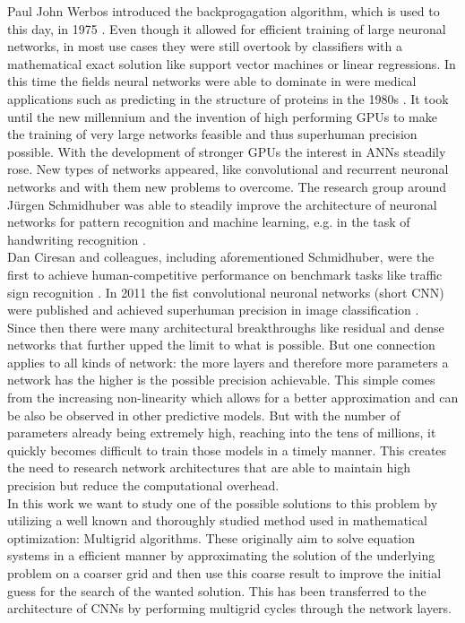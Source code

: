\documentclass[a4paper,12pt,titlepage,enabledeprecatedfontcommands]{scrreprt}
\begin{document}
Paul John Werbos introduced the backprogagation algorithm, which is used to this day, in 1975 \cite{werbos1975beyond}. Even though it allowed for efficient training of large neuronal networks, in most use cases they were still overtook by classifiers with a mathematical exact solution like support vector machines or linear regressions. In this time the fields neural networks were able to dominate in were medical applications such as predicting in the structure of proteins in the 1980s \cite{Rost1993PredictionOP}.
It took until the new millennium and the invention of high performing GPUs to make the training of very large networks feasible and thus superhuman precision possible. With the development of stronger GPUs the interest in ANNs steadily rose. New types of networks appeared, like convolutional and recurrent neuronal networks and with them new problems to overcome. The research group around Jürgen Schmidhuber was able to steadily improve the architecture of neuronal networks for pattern recognition and machine learning, e.g. in the task of handwriting recognition \cite{NIPS2008_3449}. \\
Dan Ciresan and colleagues, including aforementioned Schmidhuber, were the first to achieve human-competitive performance on benchmark tasks like traffic sign recognition \cite{2012arXiv1202.2745C}. In 2011 the fist convolutional neuronal networks (short CNN) were published \cite{CiresanConv} and achieved superhuman precision in image classification \cite{ciresan2012multicolumn}. \\
Since then there were many architectural breakthroughs like residual and dense networks that further upped the limit to what is possible. But one connection applies to all kinds of network: the more layers and therefore more parameters a network has the higher is the possible precision achievable. This simple comes from the increasing non-linearity which allows for a better approximation and can be also be observed in other predictive models. But with the number of parameters already being extremely high, reaching into the tens of millions, it quickly becomes difficult to train those models in a timely manner. This creates the need to research network architectures that are able to maintain high precision but reduce the computational overhead. \\
In this work we want to study one of the possible solutions to this problem by utilizing a well known and thoroughly studied method used in mathematical optimization: Multigrid algorithms. These originally aim to solve equation systems in a efficient manner by approximating the solution of the underlying problem on a coarser grid and then use this coarse result to improve the initial guess for the search of the wanted solution. This has been transferred to the architecture of CNNs by performing multigrid cycles through the network layers.
\end{document}

